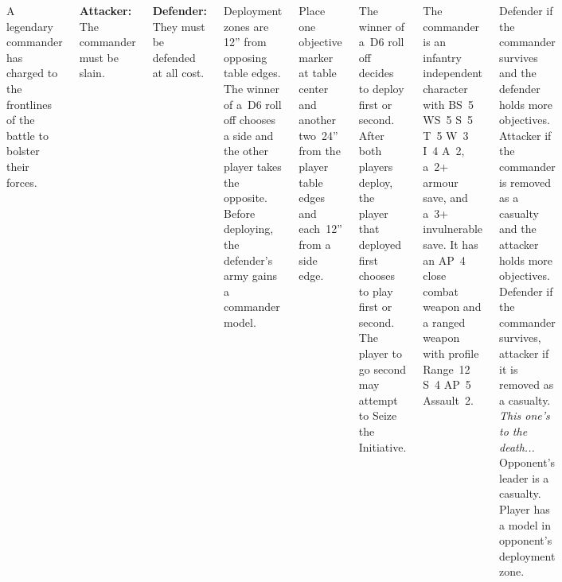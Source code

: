 
\begin{columns}

  A legendary commander has charged to the frontlines of the battle to
  bolster their forces.

  {\bf Attacker:} The commander must be slain.

  {\bf Defender:} They must be defended at all cost.

%

Deployment zones are 12'' from opposing table edges.  The winner of
a~D6 roll off chooses a side and the other player takes the opposite.
Before deploying, the defender's army gains a commander model.

Place one objective marker at table center and another two~24'' from
the player table edges and each~12'' from a side edge.

%

The winner of a~D6 roll off decides to deploy first or second.  After
both players deploy, the player that deployed first chooses to play
first or second.  The player to go second may attempt to Seize the
Initiative.

The commander is an infantry independent character with BS~5 WS~5 S~5
T~5 W~3 I~4 A~2, a~2+ armour save, and a~3+ invulnerable save.  It has
an AP~4 close combat weapon and a ranged weapon with profile Range~12
S~4 AP~5 Assault~2.

\scoringbox%
{Defender if the commander survives and the defender holds more
  objectives.  Attacker if the commander is removed as a casualty and
  the attacker holds more objectives.}%
{Defender if the commander survives, attacker if it is removed as a
  casualty.}%
{\emph{This one's to the death...}}%
{Opponent's leader is a casualty.}%
{Player has a model in opponent's deployment zone.}

\end{columns}
